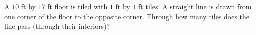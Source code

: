 A $10$ ft by $17$ ft floor is tiled with $1$ ft by $1$ ft tiles. A straight line is drawn from one corner of the floor to the opposite corner. Through how many tiles does the line pass (through their interiors)?
